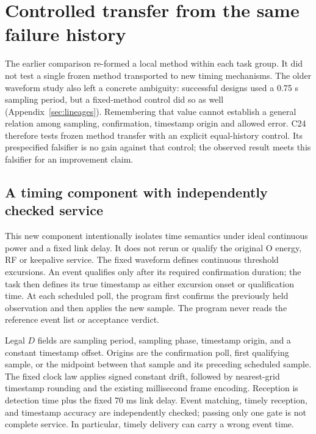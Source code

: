 \section{Controlled transfer from the same failure history}
\label{sec:c24}
The earlier comparison re-formed a local method within each task group. It did
not test a single frozen method transported to new timing mechanisms. The older
waveform study also left a concrete ambiguity: successful designs used a
0.75 s sampling period, but a fixed-method control did so as well
(Appendix~\ref{sec:lineages}). Remembering that value cannot establish a general
relation among sampling, confirmation, timestamp origin and allowed error.
C24 therefore tests frozen method transfer with an explicit equal-history
control. Its prespecified falsifier is no gain against that control; the observed
result meets this falsifier for an improvement claim.

\subsection{A timing component with independently checked service}
This new component intentionally isolates time semantics under ideal continuous
power and a fixed link delay. It does not rerun or qualify the original O
energy, RF or keepalive service. The fixed waveform defines continuous threshold
excursions. An event qualifies only after its required confirmation duration;
the task then defines its true timestamp as either excursion onset or
qualification time. At each scheduled poll, the program first confirms the
previously held observation and then applies the new sample. The program never
reads the reference event list or acceptance verdict.

Legal $D$ fields are sampling period, sampling phase, timestamp origin, and a
constant timestamp offset. Origins are the confirmation poll, first qualifying
sample, or the midpoint between that sample and its preceding scheduled sample.
The fixed clock law applies signed constant drift, followed by nearest-grid
timestamp rounding and the existing millisecond frame encoding. Reception is
detection time plus the fixed 70 ms link delay. Event matching, timely reception,
and timestamp accuracy are independently checked; passing only one gate is not
complete service. In particular, timely delivery can carry a wrong event time.


